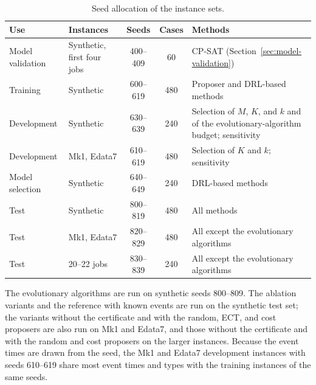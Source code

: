 \begin{table}
\centering
\begin{threeparttable}
\caption{Seed allocation of the instance sets.}
\label{tab:v9-testsets}
\footnotesize
\setlength{\tabcolsep}{4pt}
\begin{tabularx}{\textwidth}{@{}llcc>{\raggedright\arraybackslash}X@{}}
\toprule
Use & Instances & Seeds & Cases & Methods \\
\midrule
Model validation & Synthetic, first four jobs & 400--409 & 60 & CP-SAT (Section~\ref{sec:model-validation}) \\
Training & Synthetic & 600--619 & 480 & Proposer and DRL-based methods \\
Development & Synthetic & 630--639 & 240 & Selection of $M$, $K$, and $k$ and of the evolutionary-algorithm budget; sensitivity \\
Development & Mk1, Edata7 & 610--619 & 480 & Selection of $K$ and $k$; sensitivity \\
Model selection & Synthetic & 640--649 & 240 & DRL-based methods \\
Test & Synthetic & 800--819 & 480 & All methods \\
Test & Mk1, Edata7 & 820--829 & 480 & All except the evolutionary algorithms \\
Test & 20--22 jobs & 830--839 & 240 & All except the evolutionary algorithms \\
\bottomrule
\end{tabularx}
\begin{tablenotes}\footnotesize
\item The evolutionary algorithms are run on synthetic seeds 800--809. The ablation variants and the reference with known events are run on the synthetic test set; the variants without the certificate and with the random, ECT, and cost proposers are also run on Mk1 and Edata7, and those without the certificate and with the random and cost proposers on the larger instances. Because the event times are drawn from the seed, the Mk1 and Edata7 development instances with seeds 610--619 share most event times and types with the training instances of the same seeds.
\end{tablenotes}
\end{threeparttable}
\end{table}
